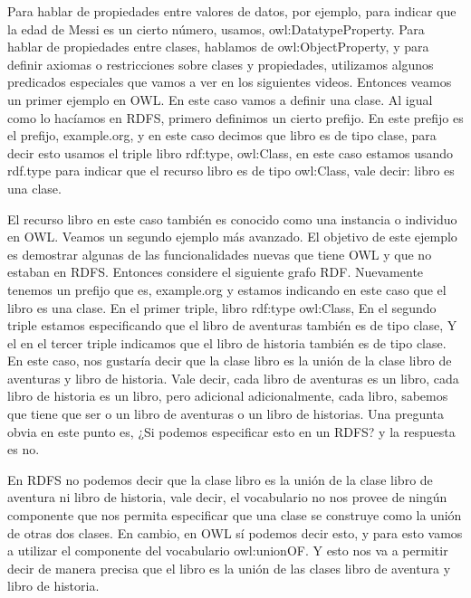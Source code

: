 Para hablar de propiedades entre valores de datos, por ejemplo, para indicar que la edad de Messi es un cierto número, usamos, owl:DatatypeProperty. Para hablar de propiedades entre clases, hablamos de owl:ObjectProperty, y para definir axiomas o restricciones sobre clases y propiedades, utilizamos algunos predicados especiales que vamos a ver en los siguientes videos. Entonces veamos un primer ejemplo en OWL. En este caso vamos a definir una clase. Al igual como lo hacíamos en RDFS, primero definimos un cierto prefijo. En este prefijo es el prefijo, example.org, y en este caso decimos que libro es de tipo clase, para decir esto usamos el triple libro rdf:type, owl:Class, en este caso estamos usando rdf.type para indicar que el recurso libro es de tipo owl:Class, vale decir: libro es una clase.

El recurso libro en este caso también es conocido como una instancia o individuo en OWL. Veamos un segundo ejemplo más avanzado. El objetivo de este ejemplo es demostrar algunas de las funcionalidades nuevas que tiene OWL y que no estaban en RDFS. Entonces considere el siguiente grafo RDF. Nuevamente tenemos un prefijo que es, example.org y estamos indicando en este caso que el libro es una clase. En el primer triple, libro rdf:type owl:Class, En el segundo triple estamos especificando que el libro de aventuras también es de tipo clase, Y el en el tercer triple indicamos que el libro de historia también es de tipo clase. En este caso, nos gustaría decir que la clase libro es la unión de la clase libro de aventuras y libro de historia. Vale decir, cada libro de aventuras es un libro, cada libro de historia es un libro, pero adicional adicionalmente, cada libro, sabemos que tiene que ser o un libro de aventuras o un libro de historias. Una pregunta obvia en este punto es, ¿Si podemos especificar esto en un RDFS? y la respuesta es no.

En RDFS no podemos decir que la clase libro es la unión de la clase libro de aventura ni libro de historia, vale decir, el vocabulario no nos provee de ningún componente que nos permita especificar que una clase se construye como la unión de otras dos clases. En cambio, en OWL sí podemos decir esto, y para esto vamos a utilizar el componente del vocabulario owl:unionOF. Y esto nos va a permitir decir de manera precisa que el libro es la unión de las clases libro de aventura y libro de historia.

